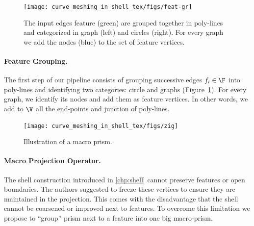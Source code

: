 \begin{figure}
    \centering
    \texttt{[image: curve\_meshing\_in\_shell\_tex/figs/feat-gr]}
    \caption{The input edges feature (green) are grouped together in poly-lines and categorized in graph (left) and circles (right). For every graph we add the nodes (blue) to the set of feature vertices.}
    \label{bichon:fig:feat-gr}
\end{figure}

\paragraph{Feature Grouping.}
The first step of our pipeline consists of grouping successive edges $f_i\in\F$ into poly-lines and identifying two categories: circle and graphs (Figure~\ref{bichon:fig:feat-gr}). For every graph, we identify its nodes and add them as feature vertices. In other words, we add to $\V$ all the end-points and junction of poly-lines.




\begin{figure}
    \centering
    \texttt{[image: curve\_meshing\_in\_shell\_tex/figs/zig]}
    \caption{Illustration of a macro prism.}
    \label{bichon:fig:zig}
\end{figure}

\paragraph{Macro Projection Operator.} 
The shell construction introduced in \ref{chp:shell} cannot preserve features or open boundaries. The authors  suggested to freeze these vertices to ensure they are maintained in the projection. This comes with the disadvantage that the shell cannot be coarsened or improved next to features. To overcome this limitation we propose to ``group'' prism next to a feature into one big macro-prism.

